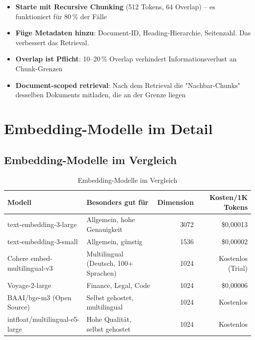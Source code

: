 \begin{itemize}[leftmargin=*]
    \item \textbf{Starte mit Recursive Chunking} (512 Tokens, 64 Overlap) -- es funktioniert für 80\,\% der Fälle
    \item \textbf{Füge Metadaten hinzu}: Document-ID, Heading-Hierarchie, Seitenzahl. Das verbessert das Retrieval.
    \item \textbf{Overlap ist Pflicht}: 10--20\,\% Overlap verhindert Informationsverlust an Chunk-Grenzen
    \item \textbf{Document-scoped retrieval}: Nach dem Retrieval die "Nachbar-Chunks" desselben Dokuments mitladen, die an der Grenze liegen
\end{itemize}

\section{Embedding-Modelle im Detail}

\subsection{Embedding-Modelle im Vergleich}

\begin{table}[H]
\centering
\begin{tabularx}{\linewidth}{lXrr}
\toprule
\textbf{Modell} & \textbf{Besonders gut für} & \textbf{Dimension} & \textbf{Kosten/1K Tokens} \\
\midrule
text-embedding-3-large & Allgemein, hohe Genauigkeit & 3072 & \$0,00013 \\
text-embedding-3-small & Allgemein, günstig & 1536 & \$0,00002 \\
Cohere embed-multilingual-v3 & Multilingual (Deutsch, 100+ Sprachen) & 1024 & Kostenlos (Trial) \\
Voyage-2-large & Finance, Legal, Code & 1024 & \$0,00006 \\
BAAI/bge-m3 (Open Source) & Selbst gehostet, multilingual & 1024 & Kostenlos \\
intfloat/multilingual-e5-large & Hohe Qualität, selbst gehostet & 1024 & Kostenlos \\
\midrule
\end{tabularx}
\caption{Embedding-Modelle im Vergleich}
\label{tab:embeddings}
\end{table}


